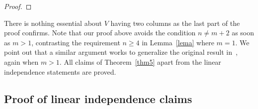 \documentclass[10pt]{amsart}
\theoremstyle{definition}
\begin{document}
\begin{proof}
\end{proof}




There is nothing essential about $V$ having two columns as the last part of the proof confirms. Note that our proof above avoids the condition $n\ne m+2$ as soon as $m>1$, contrasting the
requirement $n\ge 4$ in Lemma~\ref{lema} where $m=1$. We point out that a similar argument works to generalize the original result in~\cite{ngm}, again when $m>1$. 
All claims of Theorem~\ref{thm5} apart from the linear independence statements are proved.


\subsection{Proof of linear independence claims} \label{brand}
\end{document}
